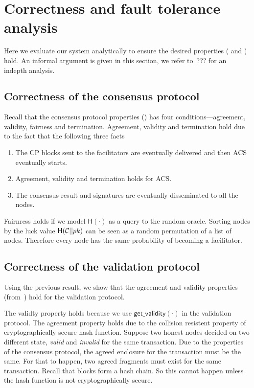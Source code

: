 \section{Correctness and fault tolerance analysis}
\label{sec:analysis}
Here we evaluate our system analytically to ensure the desired properties ( and ) hold.
An informal argument is given in this section, we refer to~\cite{checo}??? for an indepth analysis.

\subsection{Correctness of the consensus protocol}
Recall that the consensus protocol properties () has
four conditions---agreement, validity, fairness and termination.
Agreement, validity and termination hold due to the fact that the following three facts
\begin{enumerate}
    \item The CP blocks sent to the facilitators are eventually delivered and then ACS eventually starts.
    \item Agreement, validity and termination holds for ACS.
    \item The consensus result and signatures are eventually disseminated to all the nodes.
\end{enumerate}

Fairnress holds if we model $\textsf{H}(\cdot)$ as a query to the random oracle.
Sorting nodes by the luck value $\textsf{H}(\mathcal{C} || pk)$ can be seen as a random permutation of a list of nodes.
Therefore every node has the same probability of becoming a facilitator.

\subsection{Correctness of the validation protocol}
Using the previous result,
we show that the agreement and validity properties (from~) hold for the validation protocol.

The validty property holds because we use $\textsf{get\_validity}(\cdot)$ in the validation protocol.
The agreement property holds due to the collision resistent property of cryptographically secure hash function.
Suppose two honest nodes decided on two different state, \emph{valid} and \emph{invalid} for the same transaction.
Due to the properties of the consensus protocol, the agreed enclosure for the transaction must be the same.
For that to happen, two agreed fragments must exist for the same transaction.
Recall that blocks form a hash chain.
So this cannot happen unless the hash function is not cryptographically secure.

